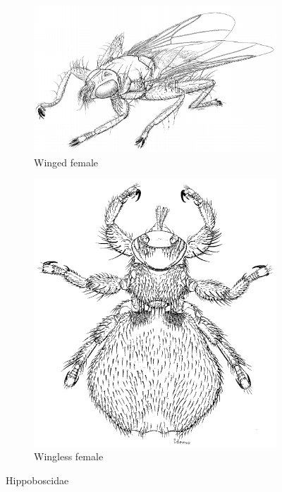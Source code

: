 \documentclass[letterpaper, 11pt]{article}
\begin{document}
\begin{figure}[ht!]
    \centering
    \begin{subfigure}[ht!]{0.45\textwidth}
        \includegraphics[width=\textwidth]{HippoboscidHabitus}
        \caption{Winged female \citep[][Fig. 111.1]{mcalpine1981manualv2}}
        \label{fig:hippoboscid1}
    \end{subfigure}
    \qquad
    \begin{subfigure}[ht!]{0.35\textwidth}
        \includegraphics[width=\textwidth]{HippoboscidFemale}
        \caption{Wingless female \citep[][Fig. 111.36]{mcalpine1981manualv2}}
        \label{fig:hippoboscid2}
    \end{subfigure}
    \caption{Hippoboscidae}\label{fig:hippoboscids}
\end{figure}

\FloatBarrier


\end{document}
